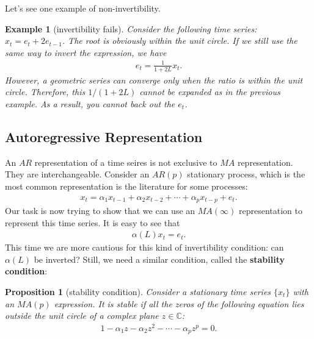 \documentclass[12pt]{article}
\newtheorem{proposition}[theorem]{Proposition}
\newtheorem{example}{Example}
\begin{document}
Let's see one example of non-invertibility.
\begin{example}[invertibility fails]
    Consider the following time series: $x_t = e_t + 2 e_{t-1}$. The root is obviously within the unit circle. If we still use the same way to invert the expression, we have
    \begin{align*}
        e_t = \frac{1}{1+2L} x_t.
    \end{align*}
    However, a geometric series can converge only when the ratio is within the unit circle. Therefore, this $1/(1+2L)$ cannot be expanded as in the previous example. As a result, you cannot back out the $e_t$.
\end{example}

\subsection{Autoregressive Representation}
An $AR$ representation of a time seires is not exclusive to $MA$ representation. They are interchangeable. Consider an $AR(p)$ stationary process, which is the most common representation is the literature for some processes:
\begin{align*}
    x_t = \alpha_1 x_{t-1} + \alpha_2 x_{t-2} + \cdots + \alpha_p x_{t-p} + e_t.
\end{align*}
Our task is now trying to show that we can use an $MA(\infty)$ representation to represent this time series. It is easy to see that
\begin{align*}
    \alpha(L) x_t = e_t.
\end{align*}
This time we are more cautious for this kind of invertibility condition: can $\alpha(L)$ be inverted? Still, we need a similar condition, called the \textbf{stability condition}:
\begin{proposition}[stability condition]
    Consider a stationary time series $\{x_t\}$ with an $MA(p)$ expression. It is stable if all the zeros of the following equation lies outside the unit circle of a complex plane $z \in \mathbb{C}$:
    \begin{align*}
        1 - \alpha_1 z - \alpha_2 z^2 - \cdots - \alpha_p z^p = 0.
    \end{align*}
\end{proposition}
\end{document}
